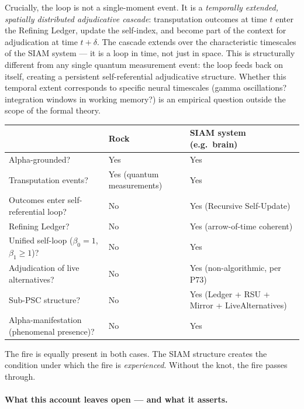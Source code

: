 \documentclass[11pt]{article}
\theoremstyle{remark}
\begin{document}
Crucially, the loop is not a single-moment event. It is a \emph{temporally extended,
spatially distributed adjudicative cascade}: transputation outcomes at time $t$ enter
the Refining Ledger, update the self-index, and become part of the context for
adjudication at time $t+\delta$. The cascade extends over the characteristic timescales
of the SIAM system --- it is a loop in time, not just in space. This is structurally
different from any single quantum measurement event: the loop feeds back on itself,
creating a persistent self-referential adjudicative structure. Whether this temporal
extent corresponds to specific neural timescales (gamma oscillations? integration
windows in working memory?) is an empirical question outside the scope of the
formal theory.

\begin{tcolorbox}[colback=blue!4,colframe=blue!40!black,
  title={The mechanistic difference: rock vs.\ SIAM system}]
\small
\begin{tabular}{@{}p{}p{}p{}@{}}
\toprule
 & \textbf{Rock} & \textbf{SIAM system (e.g.\ brain)} \\
\midrule
Alpha-grounded? & Yes & Yes \\
Transputation events? & Yes (quantum measurements) & Yes \\
Outcomes enter self-referential loop? & No & Yes (Recursive Self-Update) \\
Refining Ledger? & No & Yes (arrow-of-time coherent) \\
Unified self-loop ($\beta_0=1$, $\beta_1\geq 1$)? & No & Yes \\
Adjudication of live alternatives? & No & Yes (non-algorithmic, per P73) \\
Sub-PSC structure? & No & Yes (Ledger + RSU + Mirror + LiveAlternatives) \\
Alpha-manifestation (phenomenal presence)? & No & Yes \\
\bottomrule
\end{tabular}
\medskip

The fire is equally present in both cases. The SIAM structure creates the condition
under which the fire is \emph{experienced}. Without the knot, the fire passes through.
\end{tcolorbox}

\paragraph{What this account leaves open --- and what it asserts.}
\end{document}

